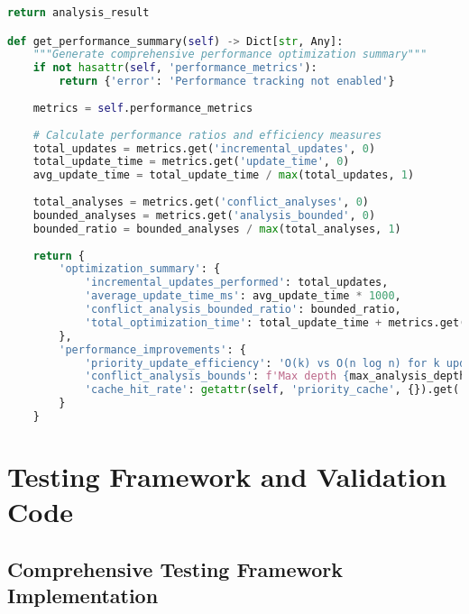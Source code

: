 \begin{lstlisting}[language=Python, caption=Complexity Optimization Implementations]
    return analysis_result

def get_performance_summary(self) -> Dict[str, Any]:
    """Generate comprehensive performance optimization summary"""
    if not hasattr(self, 'performance_metrics'):
        return {'error': 'Performance tracking not enabled'}
    
    metrics = self.performance_metrics
    
    # Calculate performance ratios and efficiency measures
    total_updates = metrics.get('incremental_updates', 0)
    total_update_time = metrics.get('update_time', 0)
    avg_update_time = total_update_time / max(total_updates, 1)
    
    total_analyses = metrics.get('conflict_analyses', 0)
    bounded_analyses = metrics.get('analysis_bounded', 0)
    bounded_ratio = bounded_analyses / max(total_analyses, 1)
    
    return {
        'optimization_summary': {
            'incremental_updates_performed': total_updates,
            'average_update_time_ms': avg_update_time * 1000,
            'conflict_analysis_bounded_ratio': bounded_ratio,
            'total_optimization_time': total_update_time + metrics.get('analysis_time', 0)
        },
        'performance_improvements': {
            'priority_update_efficiency': 'O(k) vs O(n log n) for k updates',
            'conflict_analysis_bounds': f'Max depth {max_analysis_depth} prevents exponential cases',
            'cache_hit_rate': getattr(self, 'priority_cache', {}).get('hit_rate', 0) if hasattr(self, 'priority_cache') else 0
        }
    }
\end{lstlisting}
\section{Testing Framework and Validation Code}

\subsection{Comprehensive Testing Framework Implementation}
\label{appendix:testing-framework}

